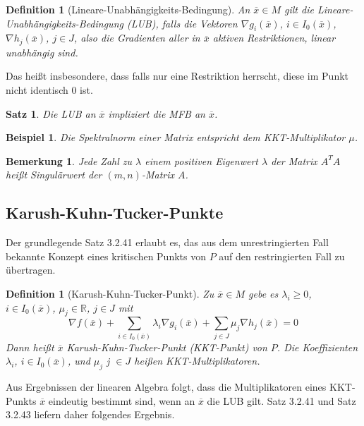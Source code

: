 \documentclass[11pt]{scrreprt}
\newcounter{thm}
\theoremstyle{thmstyle}
\numberwithin{thm}{section}
\newtheorem{beispiel}[thm]{Beispiel}
\newtheorem{bemerkung}[thm]{Bemerkung}
\newtheorem{definition}[thm]{Definition}
\newtheorem{satz}[thm]{Satz}
\begin{document}
\begin{definition}[Lineare-Unabhängigkeits-Bedingung]
	An $\overline{x} \in M$ gilt die Lineare-Unabhängigkeits-Bedingung (LUB), falls die Vektoren $\nabla g_i(\overline{x})$, $i \in I_0(\overline{x})$, $\nabla h_j(\overline{x})$, $j \in J$, also die Gradienten aller in $\overline{x}$ aktiven Restriktionen, linear unabhängig sind.
\end{definition}
 
Das heißt insbesondere, dass falls nur eine Restriktion herrscht, diese im Punkt nicht identisch $0$ ist. 
 
\begin{satz}
	Die LUB an $\overline{x}$ impliziert die MFB an $\overline{x}$.	
\end{satz}

\setcounter{thm}{44}

\begin{beispiel}
	Die Spektralnorm einer Matrix entspricht dem KKT-Multiplikator $\mu$.
\end{beispiel}


\begin{bemerkung}
	Jede Zahl zu $\lambda$ einem positiven Eigenwert $\lambda$ der Matrix $A^TA$ heißt Singulärwert der $(m, n)$-Matrix $A$.	
\end{bemerkung}

\subsection*{Karush-Kuhn-Tucker-Punkte}
 
Der grundlegende Satz 3.2.41 erlaubt es, das aus dem unrestringierten Fall bekannte Konzept eines kritischen Punkts von $P$ auf den restringierten Fall zu übertragen.

\begin{definition}[Karush-Kuhn-Tucker-Punkt]
	Zu $\overline{x} \in M$ gebe es $\lambda_i \geq 0$, $i \in I_0(\overline{x})$, $\mu_j \in \mathbb{R}$, $j \in J$ mit
		$$ \nabla f(\overline{x}) + \sum_{i \in I_0(\overline{x})} \lambda_i \nabla g_i(\overline{x}) + \sum_{j \in J} \mu_j \nabla h_j(\overline{x}) = 0 $$
	Dann heißt $\overline{x}$ Karush-Kuhn-Tucker-Punkt (KKT-Punkt) von $P$. Die Koeffizienten $\lambda_i$, $i \in I_0(\overline{x})$, und $\mu_j$ j $\in J$ heißen KKT-Multiplikatoren. 
\end{definition}

Aus Ergebnissen der linearen Algebra folgt, dass die Multiplikatoren eines KKT-Punkts $\overline{x}$ eindeutig bestimmt sind, wenn an $\overline{x}$ die LUB gilt. Satz 3.2.41 und Satz 3.2.43 liefern daher folgendes Ergebnis.
\end{document}
